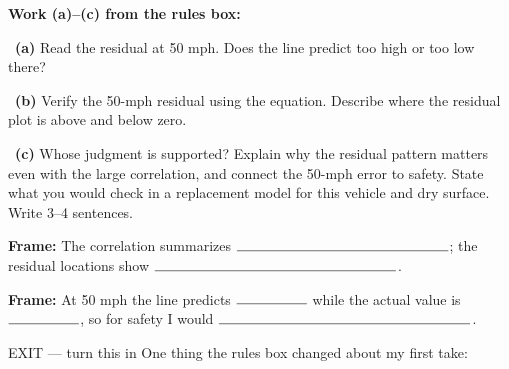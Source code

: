 \documentclass[11pt]{article}
\begin{document}
\newpage
\textbf{Work (a)--(c) from the rules box:}\par\smallskip

~\textbf{(a)} Read the residual at 50 mph. Does the line predict too high or too low there?\par
\workspace{0.65in}

~\textbf{(b)} Verify the 50-mph residual using the equation. Describe where the residual plot is above and below zero.\par
\workspace{1.35in}

~\textbf{(c)} Whose judgment is supported? Explain why the residual pattern matters even with the large correlation, and connect the 50-mph error to safety. State what you would check in a replacement model for this vehicle and dry surface. Write 3--4 sentences.\par
\workspace{1.9in}

\begin{sentenceframebox}\raggedright\textbf{Frame:} The correlation summarizes $\blank[2.1in]$; the residual locations show $\blank[2.4in]$.\end{sentenceframebox}

\begin{sentenceframebox}\raggedright\textbf{Frame:} At 50 mph the line predicts $\blank[0.7in]$ while the actual value is $\blank[0.7in]$, so for safety I would $\blank[2.5in]$.\end{sentenceframebox}

\begin{summaryexitbox}{EXIT --- turn this in}
One thing the rules box changed about my first take: \hrulefill\par
\workspace{0.4in}
\end{summaryexitbox}
\end{document}
